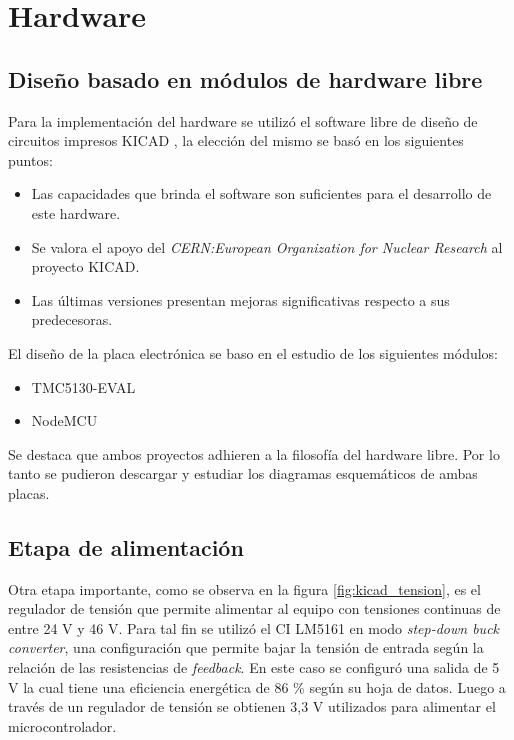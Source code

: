 \section{Hardware}
\label{section:Hardware}
\subsection{Diseño basado en módulos de hardware libre}
\label{subsection:Diseño basado en módulos de hardware libre}

Para la implementación del hardware se utilizó el software libre de diseño de circuitos impresos KICAD \citep{web_kicad}, la elección del mismo se basó en los siguientes puntos:

\begin{itemize}
\item Las capacidades que brinda el software son suficientes para el desarrollo de este hardware.
\item Se valora el apoyo del \textit{CERN:European Organization for Nuclear Research} al proyecto KICAD.
\item Las últimas versiones presentan mejoras significativas respecto a sus predecesoras.
\end{itemize}

El diseño de la placa electrónica se baso en el estudio de los siguientes módulos:
\begin{itemize}
\item TMC5130-EVAL \citep{3_web_trinamic_placa}	
\item NodeMCU \citep{web_nodemcu}
\end{itemize}
Se destaca que ambos proyectos adhieren a la filosofía del hardware libre. Por lo tanto se pudieron descargar y estudiar los diagramas esquemáticos de ambas placas. 

\subsection{Etapa de alimentación}

Otra etapa importante, como se observa en la figura \ref{fig:kicad_tension}, es el regulador de tensión que permite alimentar al equipo con tensiones continuas de entre 24 V y 46 V. Para tal fin se utilizó el CI LM5161 en modo \textit{step-down buck converter}, una configuración que permite bajar la tensión de entrada según la relación de las resistencias de \textit{feedback}. En este caso se configuró una salida de 5 V la cual tiene una eficiencia energética de 86 \% según su hoja de datos. Luego a través de un regulador de tensión se obtienen 3,3 V utilizados para alimentar el microcontrolador.

